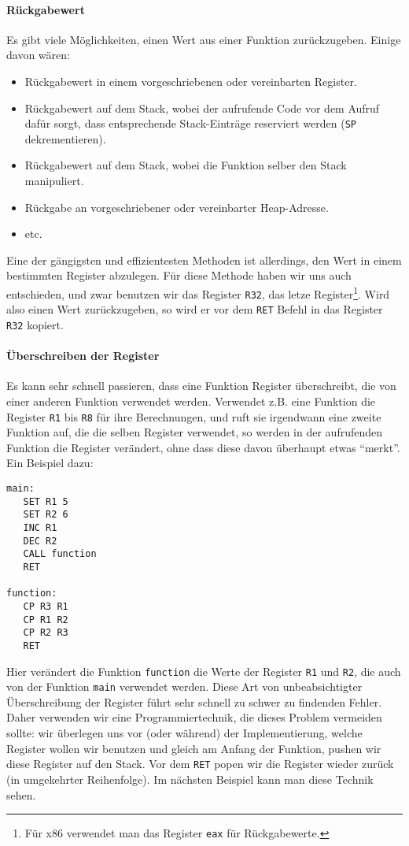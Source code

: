 \paragraph{Rückgabewert}
Es gibt viele Möglichkeiten, einen Wert aus einer Funktion zurückzugeben.
Einige davon wären:
\begin{itemize}
 \item Rückgabewert in einem vorgeschriebenen oder vereinbarten Register.
 \item Rückgabewert auf dem Stack, wobei der aufrufende Code vor dem Aufruf
       dafür sorgt, dass entsprechende Stack-Einträge reserviert werden
       (\texttt{SP} dekrementieren).
 \item Rückgabewert auf dem Stack, wobei die Funktion selber den Stack
       manipuliert.
 \item Rückgabe an vorgeschriebener oder vereinbarter Heap-Adresse.
 \item etc.
\end{itemize}
Eine der gängigsten und effizientesten Methoden ist allerdings, den Wert in
einem bestimmten Register abzulegen. Für diese Methode haben wir uns auch
entschieden, und zwar benutzen wir das Register \texttt{R32}, das letze
Register\footnote{Für x86 verwendet man das Register \texttt{eax} für
Rückgabewerte.}. Wird also einen Wert zurückzugeben, so wird er vor dem
\texttt{RET} Befehl in das Register \texttt{R32} kopiert.


\paragraph{Überschreiben der Register}
Es kann sehr schnell passieren, dass eine Funktion Register überschreibt, die
von einer anderen Funktion verwendet werden. Verwendet z.B. eine Funktion die
Register \texttt{R1} bis \texttt{R8} für ihre Berechnungen, und ruft sie
irgendwann eine zweite Funktion auf, die die selben Register verwendet, so
werden in der aufrufenden Funktion die Register verändert, ohne dass diese davon
überhaupt etwas ``merkt''. Ein Beispiel dazu:
\begin{lstlisting}
main:
   SET R1 5
   SET R2 6
   INC R1
   DEC R2
   CALL function
   RET

function:
   CP R3 R1
   CP R1 R2
   CP R2 R3
   RET
\end{lstlisting}

Hier verändert die Funktion \texttt{function} die Werte der Register \texttt{R1}
und \texttt{R2}, die auch von der Funktion \texttt{main} verwendet werden.
Diese Art von unbeabsichtigter Überschreibung der Register führt sehr schnell zu
schwer zu findenden Fehler. Daher verwenden wir eine Programmiertechnik, die
dieses Problem vermeiden sollte: wir überlegen uns vor (oder während) der
Implementierung, welche Register wollen wir benutzen und gleich am Anfang der
Funktion, pushen wir diese Register auf den Stack. Vor dem \texttt{RET} popen
wir die Register wieder zurück (in umgekehrter Reihenfolge). Im nächsten
Beispiel kann man diese Technik sehen.

